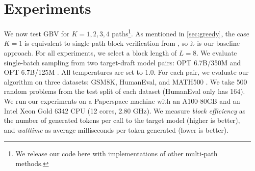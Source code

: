 \documentclass{article}
\theoremstyle{plain}
\theoremstyle{definition}
\theoremstyle{remark}
\begin{document}
\section{Experiments}
\label{sec:experiments}

We now test GBV for $K=1,2,3,4$ paths\footnote{We release our code \href{https://anonymous.4open.science/r/Greedy_Block_Verification-B800}{here} with implementations of other multi-path methods.}. As mentioned in \cref{sec:greedy}, the case $K=1$ is equivalent to single-path block verification from \citet{sun2024block}, so it is our baseline approach. For all experiments, we select a block length of $L=8$. We evaluate single-batch sampling from two target-draft model pairs: OPT 6.7B/350M and OPT 6.7B/125M \citep{zhang2022opt}. All temperatures are set to 1.0. For each pair, we evaluate our algorithm on three datasets: GSM8K, HumanEval, and MATH500 \citep{chen2021evaluating,hendrycks2021math,cobbe2021training}. We take 500 random problems from the test split of each dataset (HumanEval only has 164). We run our experiments on a Paperspace machine with an A100-80GB and an Intel Xeon Gold 6342 CPU (12 cores, 2.80 GHz). We measure \emph{block efficiency} as the number of generated tokens per call to the target model (higher is better), and \emph{walltime} as average milliseconds per token generated (lower is better).

\end{document}
